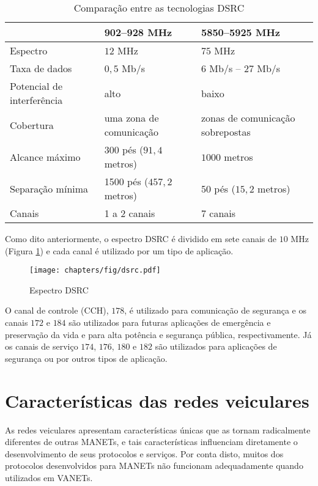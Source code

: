\begin{table}[htbp]
                \centering
                \begin{tabular}{l l l}
                \toprule
                & 902--928 MHz & 5850--5925 MHz\\
                \midrule
                Espectro & $12$ MHz & $75$ MHz\\
                Taxa de dados  & $0,5$ Mb/s & $6$ Mb/s -- $27$ Mb/s \\
                Potencial de interferência & alto & baixo \\
                Cobertura & uma zona de comunicação & zonas de comunicação sobrepostas\\
                Alcance máximo & $300$ pés ($91,4$ metros) & $1000$ metros\\
                Separação mínima & 1500 pés ($457,2$ metros) & 50 pés ($15,2$ metros)\\
                Canais & 1 a 2 canais & 7 canais\\
                \bottomrule
                \end{tabular}
\caption{Comparação entre as tecnologias DSRC}
 \label{tab:dsrccomparison}
\end{table}

Como dito anteriormente, o espectro DSRC é dividido em sete canais
de $10$ MHz (Figura \ref{fig:dsrc}) e cada canal é utilizado por um
tipo de aplicação.

\begin{figure}[htbp]
\centering
 \texttt{[image: chapters/fig/dsrc.pdf]}
\caption{Espectro DSRC}
\label{fig:dsrc}
\end{figure}

O canal de controle (CCH), $178$, é utilizado para comunicação de segurança e
os canais $172$ e $184$ são utilizados para futuras aplicações de emergência e
preservação da vida e para alta potência e segurança pública, respectivamente.
Já os canais de serviço $174$, $176$, $180$ e $182$ são utilizados para
aplicações de segurança ou por outros tipos de aplicação.


\section{Características das redes veiculares}

As redes veiculares apresentam características únicas que as tornam
radicalmente diferentes \cite{blum2004challenges} de outras MANETs, e
tais características influenciam diretamente o desenvolvimento de
seus protocolos e serviços. Por conta disto, muitos dos protocolos
desenvolvidos para MANETs não funcionam adequadamente quando utilizados
em VANETs.

